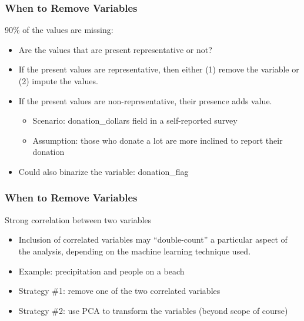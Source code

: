 \begin{frame}[fragile] \frametitle{When to Remove Variables}
90\% of the values are missing:
\begin{itemize}
\item Are the values that are present representative or not?
\item If the present values are representative, then either (1) remove the variable or (2) impute the values.
\item If the present values are non-representative, their presence adds value.
\begin{itemize}
\item Scenario: donation\_dollars field in a self-reported survey
\item Assumption: those who donate a lot are more inclined to report their donation
\end{itemize}
\item Could also binarize the variable: donation\_flag
\end{itemize}

\end{frame}


\begin{frame}[fragile] \frametitle{When to Remove Variables}
 Strong correlation between two variables

\begin{itemize}
	\item Inclusion of correlated variables may ``double-count'' a particular aspect of the analysis, depending on the machine learning technique used.
	\item Example: precipitation and people on a beach
	\item Strategy \#1: remove one of the two correlated variables
	\item Strategy \#2: use PCA to transform the variables (beyond scope of course)
\end{itemize}
\end{frame}


